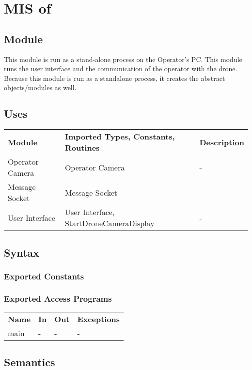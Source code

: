 \documentclass[12pt, titlepage]{article}
\begin{document}
\section{MIS of } \label{MAIN_INTERFACE} 
\subsection{Module}
This module is run as a stand-alone process on the Operator's PC. This module runs the user interface and the communication of the operator with the drone. Because this module is run as a standalone process, it creates the abstract objects/modules as well.

\subsection{Uses}
\begin{center}
\begin{tabular}{p{2 cm} p{5cm} p{6.5cm} } 
\hline
\textbf{Module} & \textbf{Imported Types, Constants, Routines} & \textbf{Description} \\
Operator Camera & Operator Camera & - \\
Message Socket & Message Socket & - \\
User Interface & User Interface, StartDroneCameraDisplay & - \\
\hline
\hline
\end{tabular}
\end{center}
\subsection{Syntax}
\subsubsection{Exported Constants}
\subsubsection{Exported Access Programs}
\begin{center}
\begin{tabular}{p{3.5cm} p{2.5cm} p{2.5cm} p{5cm}}
\hline
\textbf{Name} & \textbf{In} & \textbf{Out} & \textbf{Exceptions} \\
main & - & - & - \\
\hline
\hline
\end{tabular}
\end{center}
\subsection{Semantics}
\end{document}
